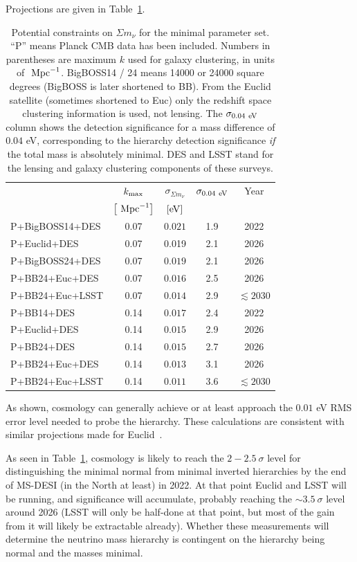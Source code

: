Projections are given in Table~\ref{tablemnulensing}.
\begin{table}[b]
\caption{ 
Potential constraints on 
$\Sigma m_{\nu}$ for the minimal parameter set.
``P'' means Planck CMB data has been included.
Numbers in parentheses are maximum $k$ used for galaxy clustering, in units of
$\ {\rm Mpc}^{-1}$. 
BigBOSS14 / 24 means 14000 or 24000 square degrees (BigBOSS is later shortened to BB). 
From the Euclid satellite (sometimes shortened to Euc) 
only the redshift space clustering information is used, not lensing.
The $\sigma_{0.04~{\rm eV}}$ column shows the detection significance for a
mass difference of $0.04$ eV, corresponding to the hierarchy detection 
significance {\em if} the total mass is absolutely minimal.
DES and LSST stand for the lensing and galaxy clustering components of these 
surveys. 
\label{tablemnulensing}}
\vspace{-0.3cm}
\begin{center}
\begin{tabular}{lcccc}
\hline
$ $ & $k_{\rm max}$ & $\sigma_{\Sigma m_{\nu}}$ & $\sigma_{0.04~{\rm eV}}$ & 
Year \\
$ $ & $\left[\ {\rm Mpc}^{-1}\right]$ & $\left[{\rm eV}\right]$ & &  \\
\hline
P+BigBOSS14+DES & 0.07 & $0.021$ & 1.9 & 2022 \\
P+Euclid+DES & 0.07 & 0.019 & 2.1 & 2026 \\
P+BigBOSS24+DES & 0.07 & $0.019$ & 2.1 & 2026 \\
P+BB24+Euc+DES & 0.07 & $0.016$ & 2.5 & 2026 \\
P+BB24+Euc+LSST & 0.07 & $0.014$ & 2.9 & $\lesssim 2030$  \\
P+BB14+DES & 0.14 & $0.017$ & 2.4 & 2022 \\
P+Euclid+DES & 0.14 & $0.015$ & 2.9 & 2026 \\
P+BB24+DES & 0.14 & $0.015$ & 2.7 & 2026 \\
P+BB24+Euc+DES & 0.14 & $0.013$ & 3.1 & 2026 \\
P+BB24+Euc+LSST & 0.14 & $0.011$ & 3.6 & $\lesssim 2030$ \\
\hline
\end{tabular}
\end{center}
\vspace{-0.3cm}
\end{table}
As shown, cosmology can generally achieve or at least approach the 
$0.01$ eV RMS error level needed to probe the hierarchy. 
These calculations are consistent with similar projections made for
Euclid~\cite{2013JCAP...01..026A}. 


As seen in Table~\ref{tablemnulensing}, cosmology is 
likely to reach the $2-2.5~\sigma$ level for distinguishing the minimal normal 
from minimal inverted hierarchies by the end of MS-DESI (in the North at 
least) in 2022. At that point
Euclid and LSST will be running, and significance will accumulate, probably 
reaching the $\sim 3.5~\sigma$ level around 2026 (LSST will only be half-done 
at that
point, but most of the gain from it will likely be extractable already).
Whether these measurements will determine the neutrino mass hierarchy is contingent on the hierarchy being normal and the masses minimal.  
